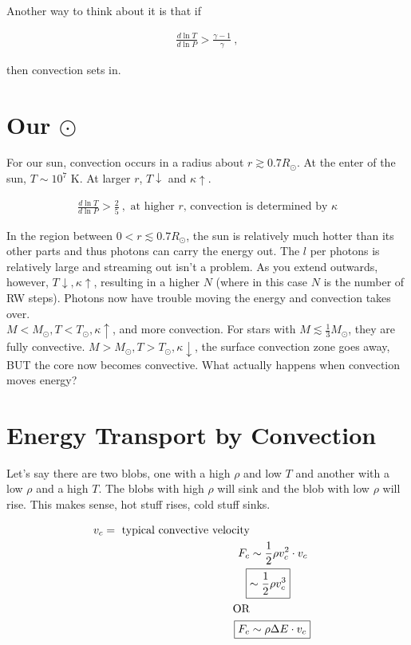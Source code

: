 Another way to think about it is that if 

\begin{align}
\frac{d \ln T}{d \ln P} > \frac{\gamma -1}{\gamma}~,
\end{align}

then convection sets in.

\section{Our $\odot$}

For our sun, convection occurs in a radius about $r \gtrsim 0.7 R_\odot$. At the enter of the sun, $T\sim 10^7$ K. At larger $r$, $T \downarrow$ and $\kappa \uparrow$. 

\begin{align}
\frac{d \ln T}{d \ln P} > \frac{2}{5}~,\text{ at higher $r$, convection is determined by $\kappa$}
\end{align}

In the region between $0 < r \lesssim 0.7R_\odot$, the sun is relatively much hotter than its other parts and thus photons can carry the energy out. The $l$ per photons is relatively large and streaming out isn't a problem. As you extend outwards, however, $T \downarrow, \kappa \uparrow$, resulting in a higher $N$ (where in this case $N$ is the number of RW steps). Photons now have trouble moving the energy and convection takes over. \\

$M < M_\odot, T < T_\odot, \kappa \uparrow$, and more convection. For stars with $M \lesssim \frac{1}{3}M_\odot$, they are fully convective. $M > M_\odot, T > T_\odot, \kappa \downarrow$, the surface convection zone goes away, BUT the core now becomes convective. What actually happens when convection moves energy?

\section{Energy Transport by Convection}

Let's say there are two blobs, one with a high $\rho$ and low $T$ and another with a low $\rho$ and a high $T$. The blobs with high $\rho$ will sink and the blob with low $\rho$ will rise. This makes sense, hot stuff rises, cold stuff sinks. 

\begin{align}
v_c = \text{ typical convective velocity}\\
F_c &\sim \frac{1}{2}\rho v_c^2 \cdot v_c \\
\Aboxed{&\sim \frac{1}{2} \rho v_c^3}\\
\text{OR}\\
\Aboxed{F_c &\sim \rho \Delta E \cdot v_c}
\end{align}

